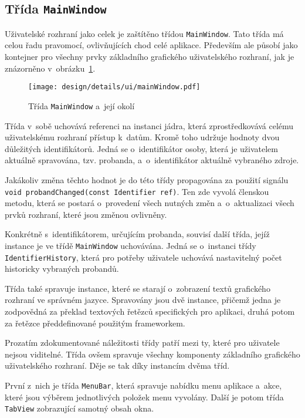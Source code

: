 		
		\subsection*{Třída \texttt{MainWindow}}
		Uživatelské rozhraní jako celek je zaštítěno třídou \texttt{MainWindow}. Tato třída má celou řadu pravomocí, ovlivňujících chod celé aplikace. Především ale působí jako kontejner pro všechny prvky základního grafického uživatelského rozhraní, jak je znázorněno v~obrázku~\ref{fig:designDetailMainWindow}.\par
		\begin{figure}[h]
			\centering
			\texttt{[image: design/details/ui/mainWindow.pdf]}
			\caption{Třída \texttt{MainWindow} a~její okolí}
			\label{fig:designDetailMainWindow}
		\end{figure}
		Třída v~sobě uchovává referenci na instanci jádra, která zprostředkovává celému uživatelskému rozhraní přístup k~datům. Kromě toho udržuje hodnoty dvou důležitých identifikátorů. Jedná se o~identifikátor osoby, která je uživatelem aktuálně spravována, tzv. probanda, a~o~identifikátor aktuálně vybraného zdroje. \par
		Jakákoliv změna těchto hodnot je do této třídy propagována za použití signálu \texttt{void probandChanged(const Identifier ref)}. Ten zde vyvolá členskou metodu, která se postará o~provedení všech nutných změn a~o~aktualizaci všech prvků rozhraní, které jsou změnou ovlivněny. \par
		Konkrétně s~identifikátorem, určujícím probanda, souvisí další třída, jejíž instance je ve třídě \texttt{MainWindow} uchovávána. Jedná se o~instanci třídy \texttt{IdentifierHistory}, která pro potřeby uživatele uchovává nastavitelný počet historicky vybraných probandů. \par
		Třída také spravuje instance, které se starají o~zobrazení textů grafického rozhraní ve správném jazyce. Spravovány jsou dvě instance, přičemž jedna je zodpovědná za překlad textových řetězců specifických pro aplikaci, druhá potom za řetězce předdefinované použitým frameworkem.\par
		Prozatím zdokumentované náležitosti třídy patří mezi ty, které pro uživatele nejsou viditelné. Třída ovšem spravuje všechny komponenty základního grafického uživatelského rozhraní. Děje se tak díky instancím dvěma tříd.\par 
		První z~nich je třída \texttt{MenuBar}, která spravuje nabídku menu aplikace a~akce, které jsou výběrem jednotlivých položek menu vyvolány. Další je potom třída \texttt{TabView} zobrazující samotný obsah okna.\par
		
